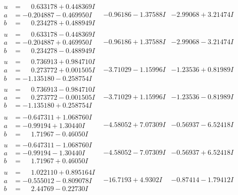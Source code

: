 \documentclass[1p]{elsarticle_modified}
\theoremstyle{definition}
\begin{document}
$$\begin{array}{c|c|c}
\begin{aligned}
u &= \phantom{-}0.633178 + 0.448369 I \\
a &= -0.204887 - 0.469950 I \\
b &= \phantom{-}0.234278 + 0.488949 I\end{aligned}
 & -0.96186 - 1.37588 I & -2.99068 + 3.21474 I \\ \hline\begin{aligned}
u &= \phantom{-}0.633178 - 0.448369 I \\
a &= -0.204887 + 0.469950 I \\
b &= \phantom{-}0.234278 - 0.488949 I\end{aligned}
 & -0.96186 + 1.37588 I & -2.99068 - 3.21474 I \\ \hline\begin{aligned}
u &= \phantom{-}0.736913 + 0.984710 I \\
a &= \phantom{-}0.273772 + 0.001505 I \\
b &= -1.135180 - 0.258754 I\end{aligned}
 & -3.71029 - 1.15996 I & -1.23536 + 0.81989 I \\ \hline\begin{aligned}
u &= \phantom{-}0.736913 - 0.984710 I \\
a &= \phantom{-}0.273772 - 0.001505 I \\
b &= -1.135180 + 0.258754 I\end{aligned}
 & -3.71029 + 1.15996 I & -1.23536 - 0.81989 I \\ \hline\begin{aligned}
u &= -0.647311 + 1.068760 I \\
a &= -0.99194 + 1.30440 I \\
b &= \phantom{-}1.71967 - 0.46050 I\end{aligned}
 & -4.58052 + 7.07309 I & -0.56937 - 6.52418 I \\ \hline\begin{aligned}
u &= -0.647311 - 1.068760 I \\
a &= -0.99194 - 1.30440 I \\
b &= \phantom{-}1.71967 + 0.46050 I\end{aligned}
 & -4.58052 - 7.07309 I & -0.56937 + 6.52418 I \\ \hline\begin{aligned}
u &= \phantom{-}1.022110 + 0.895164 I \\
a &= -0.555012 - 0.809078 I \\
b &= \phantom{-}2.44769 - 0.22730 I\end{aligned}
 & -16.7193 + 4.9302 I & -0.87414 - 1.79412 I \\ \hline\begin{aligned}

\end{aligned}
\end{array}$$
\end{document}

